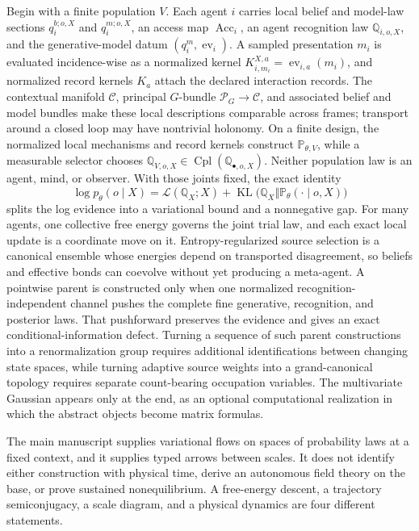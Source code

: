\documentclass[11pt,letterpaper]{article}
\newcommand{\KL}{\operatorname{KL}}
\newcommand{\Prob}{\mathbb P}
\newcommand{\Rec}{\mathbb Q}
\begin{document}
Begin with a finite population \(V\). Each agent \(i\) carries local belief and model-law sections \(q_i^{b;o,X}\) and \(q_i^{m;o,X}\), an access map \(\operatorname{Acc}_i\), an agent recognition law \(\mathbb Q_{i,o,X}\), and the generative-model datum \((q_i^m,\operatorname{ev}_i)\). A sampled presentation \(m_i\) is evaluated incidence-wise as a normalized kernel \(K^{X,a}_{i,m_i}=\operatorname{ev}_{i,a}(m_i)\), and normalized record kernels \(K_a\) attach the declared interaction records. The contextual manifold \(\mathcal C\), principal \(G\)-bundle \(\mathscr P_G\to\mathcal C\), and associated belief and model bundles make these local descriptions comparable across frames; transport around a closed loop may have nontrivial holonomy. On a finite design, the normalized local mechanisms and record kernels construct \(\mathbb P_{\theta,V}\), while a measurable selector chooses \(\mathbb Q_{V,o,X}\in\operatorname{Cpl}(\mathbb Q_{\bullet,o,X})\). Neither population law is an agent, mind, or observer. With those joints fixed, the exact identity
\begin{equation}
  \log p_\theta(o\mid X)
  =\mathcal L(\Rec_X;X)
  +\KL\bigl(\Rec_X\Vert\Prob_\theta(\cdot\mid o,X)\bigr)
  \label{eq:elbo-identity}
\end{equation}
splits the log evidence into a variational bound and a nonnegative gap. For many agents, one collective free energy governs the joint trial law, and each exact local update is a coordinate move on it. Entropy-regularized source selection is a canonical ensemble whose energies depend on transported disagreement, so beliefs and effective bonds can coevolve without yet producing a meta-agent. A pointwise parent is constructed only when one normalized recognition-independent channel pushes the complete fine generative, recognition, and posterior laws. That pushforward preserves the evidence and gives an exact conditional-information defect. Turning a sequence of such parent constructions into a renormalization group requires additional identifications between changing state spaces, while turning adaptive source weights into a grand-canonical topology requires separate count-bearing occupation variables. The multivariate Gaussian appears only at the end, as an optional computational realization in which the abstract objects become matrix formulas.

\begin{physicalreading}
The main manuscript supplies variational flows on spaces of probability laws at a fixed context, and it supplies typed arrows between scales. It does not identify either construction with physical time, derive an autonomous field theory on the base, or prove sustained nonequilibrium. A free-energy descent, a trajectory semiconjugacy, a scale diagram, and a physical dynamics are four different statements.
\end{physicalreading}
\end{document}
